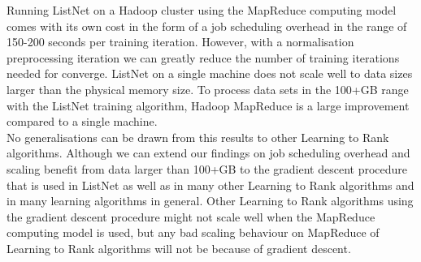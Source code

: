 Running ListNet on a Hadoop cluster using the MapReduce computing model comes with its own cost in the form of a job scheduling overhead in the range of 150-200 seconds per training iteration. However, with a normalisation preprocessing iteration we can greatly reduce the number of training iterations needed for converge. ListNet on a single machine does not scale well to data sizes larger than the physical memory size. To process data sets in the 100+GB range with the ListNet training algorithm, Hadoop MapReduce is a large improvement compared to a single machine.\\

No generalisations can be drawn from this results to other Learning to Rank algorithms. Although we can extend our findings on job scheduling overhead and scaling benefit from data larger than 100+GB to the gradient descent procedure that is used in ListNet as well as in many other Learning to Rank algorithms and in many learning algorithms in general. Other Learning to Rank algorithms using the gradient descent procedure might not scale well when the MapReduce computing model is used, but any bad scaling behaviour on MapReduce of Learning to Rank algorithms will not be because of gradient descent.

